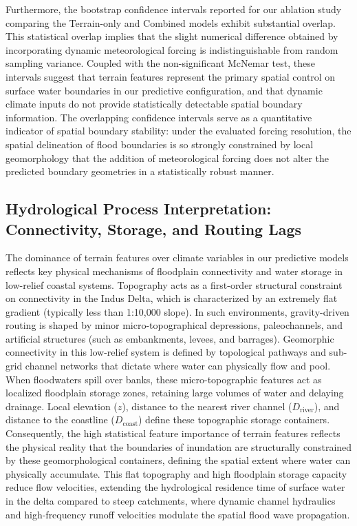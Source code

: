 Furthermore, the bootstrap confidence intervals reported for our ablation study comparing the Terrain-only and Combined models exhibit substantial overlap. This statistical overlap implies that the slight numerical difference obtained by incorporating dynamic meteorological forcing is indistinguishable from random sampling variance. Coupled with the non-significant McNemar test, these intervals suggest that terrain features represent the primary spatial control on surface water boundaries in our predictive configuration, and that dynamic climate inputs do not provide statistically detectable spatial boundary information. The overlapping confidence intervals serve as a quantitative indicator of spatial boundary stability: under the evaluated forcing resolution, the spatial delineation of flood boundaries is so strongly constrained by local geomorphology that the addition of meteorological forcing does not alter the predicted boundary geometries in a statistically robust manner.

\subsection{Hydrological Process Interpretation: Connectivity, Storage, and Routing Lags}
The dominance of terrain features over climate variables in our predictive models reflects key physical mechanisms of floodplain connectivity and water storage in low-relief coastal systems. Topography acts as a first-order structural constraint on connectivity in the Indus Delta, which is characterized by an extremely flat gradient (typically less than 1:10,000 slope). In such environments, gravity-driven routing is shaped by minor micro-topographical depressions, paleochannels, and artificial structures (such as embankments, levees, and barrages). Geomorphic connectivity in this low-relief system is defined by topological pathways and sub-grid channel networks that dictate where water can physically flow and pool. When floodwaters spill over banks, these micro-topographic features act as localized floodplain storage zones, retaining large volumes of water and delaying drainage. Local elevation ($z$), distance to the nearest river channel ($D_{\text{river}}$), and distance to the coastline ($D_{\text{coast}}$) define these topographic storage containers. Consequently, the high statistical feature importance of terrain features reflects the physical reality that the boundaries of inundation are structurally constrained by these geomorphological containers, defining the spatial extent where water can physically accumulate. This flat topography and high floodplain storage capacity reduce flow velocities, extending the hydrological residence time of surface water in the delta compared to steep catchments, where dynamic channel hydraulics and high-frequency runoff velocities modulate the spatial flood wave propagation.

